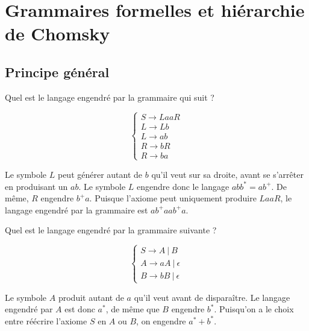 \chapter{Grammaires formelles et hiérarchie de Chomsky}
\label{grammaires}


\section{Principe général}



\begin{exercice}
Quel est le langage engendré par la grammaire qui suit ? 

\[
\begin{cases}
S \rightarrow LaaR \\
L \rightarrow Lb \\
L \rightarrow ab \\
R \rightarrow bR \\
R \rightarrow ba
\end{cases}
\]

\end{exercice}

\begin{correction*}
Le symbole $L$ peut générer autant de $b$ qu'il veut sur sa droite, avant se s'arrêter en produisant un $ab$. Le symbole $L$ engendre donc le langage $abb^* = ab^+$. De même, $R$ engendre $b^+a$. Puisque l'axiome peut uniquement produire $LaaR$, le langage engendré par la grammaire est $ab^+aab^+a$.
\end{correction*}

\begin{exercice}
\label{grammab}
Quel est le langage engendré par la grammaire suivante ?

\[
\begin{cases}
S \rightarrow A~|~B \\
A \rightarrow aA~|~\epsilon \\
B \rightarrow bB~|~\epsilon
\end{cases}
\]

\end{exercice}

\begin{correction*}
Le symbole $A$ produit autant de $a$ qu'il veut avant de disparaître. Le langage engendré par $A$ est donc $a^*$, de même que $B$ engendre $b^*$. Puisqu'on a le choix entre réécrire l'axiome $S$ en $A$ ou $B$, on engendre $a^*+b^*$.
\end{correction*}

